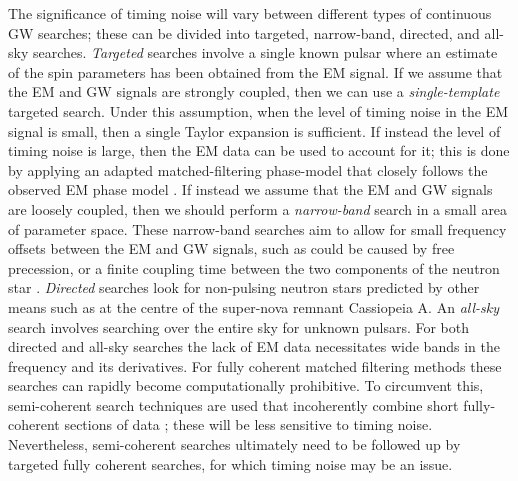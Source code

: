 \documentclass[../full_thesis/full_thesis.tex]{subfiles}
\begin{document}
The significance of timing noise will vary between different types of continuous GW
searches; these can be divided into targeted, narrow-band, directed, and
all-sky searches.  \emph{Targeted} searches involve a single known pulsar where
an estimate of the spin parameters has been obtained from the EM signal. If we
assume that the EM and GW signals are strongly coupled, then we can use a
\emph{single-template} targeted search. Under this assumption, when the level
of timing noise in the EM signal is small, then a single Taylor expansion is
sufficient.  If instead the level of timing noise is large, then the EM data
can be used to account for it; this is done by applying an adapted
matched-filtering phase-model that closely follows the observed EM phase model
\citep{Pitkin2004}. If instead we assume that the EM and GW signals are
loosely coupled, then we should perform a \emph{narrow-band} search in a small
area of parameter space.  These narrow-band searches aim to allow for small
frequency offsets between the EM and GW signals, such as could be caused by
free precession, or a finite coupling time between the two components of the
neutron star \citep{ligo2008}. \emph{Directed} searches look for non-pulsing
neutron stars predicted by other means such as at the centre of the super-nova
remnant Cassiopeia A. An \emph{all-sky} search involves searching over the
entire sky for unknown pulsars. For both directed and all-sky searches the lack
of EM data necessitates wide bands in the frequency and its derivatives. For
fully coherent matched filtering methods these searches can rapidly become
computationally prohibitive. To circumvent this, semi-coherent search
techniques are used that incoherently combine short fully-coherent sections of
data \citep{ligo2012}; these will be less sensitive to timing noise.
Nevertheless, semi-coherent searches  ultimately need to be followed up by
targeted fully coherent searches, for which timing noise may be an issue.
\end{document}
